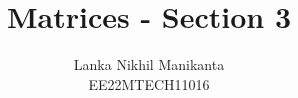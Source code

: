 \documentclass[journal,12pt,twocolumn]{IEEEtran}
\begin{document}
\makeatletter
{}
\makeatother

\let\StandardTheFigure\thefigure
\let\vec\mathbf
\let\j\jmath
\renewcommand{\thefigure}{\theproblem}



\def\putbox#1#2#3{\makebox[0in][l]{\makebox[#1][l]{}\raisebox{\baselineskip}[0in][0in]{\raisebox{#2}[0in][0in]{#3}}}}
     \def\rightbox#1{\makebox[0in][r]{#1}}
     \def\centbox#1{\makebox[0in]{#1}}
     \def\topbox#1{\raisebox{-\baselineskip}[0in][0in]{#1}}
     \def\midbox#1{\raisebox{-0.5\baselineskip}[0in][0in]{#1}}

\vspace{3cm}

\title{
	Matrices - Section 3
}


%
%
%

\author{
	Lanka Nikhil Manikanta	\\
	EE22MTECH11016
}
% 
%
\end{document}
